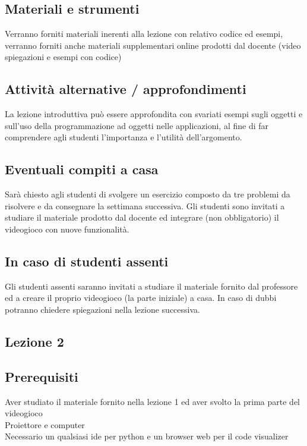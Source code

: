 \documentclass[12pt,a4paper]{article}
\begin{document}
\subsection*{Materiali e strumenti}
Verranno forniti materiali inerenti alla lezione con relativo codice ed esempi, verranno forniti anche materiali supplementari online prodotti dal docente (video spiegazioni e esempi con codice)


\subsection*{Attività alternative / approfondimenti}
La lezione introduttiva può essere approfondita con svariati esempi sugli oggetti e sull’uso della programmazione ad oggetti nelle applicazioni, al fine di far comprendere agli studenti l’importanza e l’utilità dell’argomento.

\subsection*{Eventuali compiti a casa}
Sarà chiesto agli studenti di svolgere un esercizio composto da tre problemi da risolvere e da consegnare la settimana successiva. Gli studenti sono invitati a studiare il materiale prodotto dal docente ed integrare (non obbligatorio) il videogioco con nuove funzionalità.
\subsection*{In caso di studenti assenti}
Gli studenti assenti saranno invitati a studiare il materiale fornito dal professore ed a creare il proprio videogioco (la parte iniziale) a casa. In caso di dubbi potranno chiedere spiegazioni nella lezione successiva.













\subsection{Lezione 2} 

\subsection*{Prerequisiti}
Aver studiato il materiale fornito nella lezione 1 ed aver svolto la prima parte del videogioco\\
Proiettore e computer\\
Necessario un qualsiasi ide per python e un browser web per il code visualizer
\end{document}

